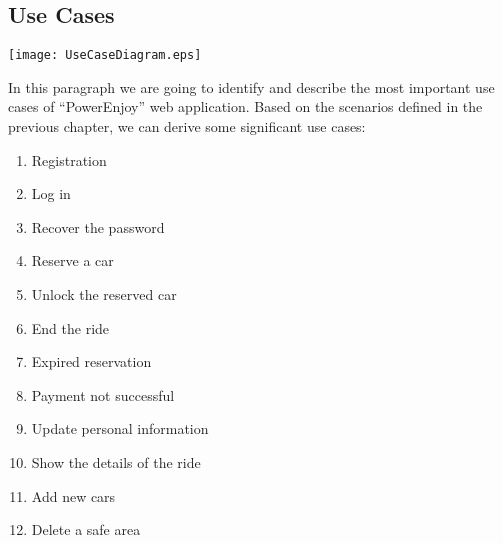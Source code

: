 \pagebreak
\subsection{Use Cases}
\centerline{
	\vspace{2cm}
		\texttt{[image: UseCaseDiagram.eps]}}



\pagebreak
In this paragraph we are going to identify and describe the most important use cases of ``PowerEnjoy'' web application.
Based on the scenarios defined in the previous chapter, we can derive some significant use cases:
\begin{enumerate}
	\item Registration
	\item Log in
	\item Recover the password
	\item Reserve a car
	\item Unlock the reserved car
	\item End the ride
	\item Expired reservation
	\item Payment not successful
	\item Update personal information
	\item Show the details of the ride
	\item Add new cars
	\item Delete a safe area
\end{enumerate}

\newtoggle{exception}
\newenvironment{UseCase}[5]{
	\paragraph{Partecipating actors:} #1
	\paragraph{Entry condition:} #2
	\paragraph{Flow of events:}
	\begin{itemize} 
		#3 
	\end{itemize}
	\paragraph{Exit condition:} #4
	\iftoggle{exception}{
		\paragraph{Exceptions:}
		\begin{itemize}
			#5
		\end{itemize}
	}{
	}
}{}

